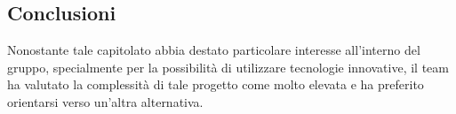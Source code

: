 \subsection{Conclusioni}
Nonostante tale capitolato abbia destato particolare interesse all’interno del gruppo, specialmente per la possibilità di utilizzare tecnologie innovative, il team ha valutato la complessità di tale progetto come molto elevata e ha preferito orientarsi verso un’altra alternativa.
